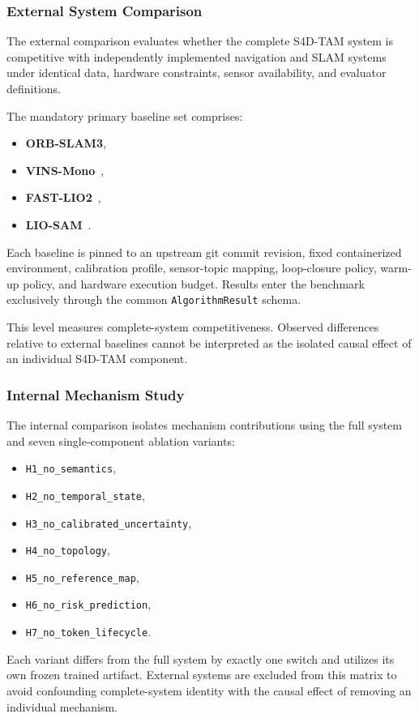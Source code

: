 \subsubsection{External System Comparison}
\label{subsubsec:external_comparison}

The external comparison evaluates whether the complete S4D-TAM system is competitive with independently implemented navigation and SLAM systems under identical data, hardware constraints, sensor availability, and evaluator definitions.

The mandatory primary baseline set comprises:
\begin{itemize}
  \item \textbf{ORB-SLAM3},
  \item \textbf{VINS-Mono}~\cite{qin2018vinsmono},
  \item \textbf{FAST-LIO2}~\cite{xu2022fastlio2},
  \item \textbf{LIO-SAM}~\cite{shan2020liosam}.
\end{itemize}
Each baseline is pinned to an upstream git commit revision, fixed containerized environment, calibration profile, sensor-topic mapping, loop-closure policy, warm-up policy, and hardware execution budget. Results enter the benchmark exclusively through the common \texttt{AlgorithmResult} schema.

This level measures complete-system competitiveness. Observed differences relative to external baselines cannot be interpreted as the isolated causal effect of an individual S4D-TAM component.

\subsubsection{Internal Mechanism Study}
\label{subsubsec:internal_study}

The internal comparison isolates mechanism contributions using the full system and seven single-component ablation variants:
\begin{itemize}
  \item \texttt{H1\_no\_semantics},
  \item \texttt{H2\_no\_temporal\_state},
  \item \texttt{H3\_no\_calibrated\_uncertainty},
  \item \texttt{H4\_no\_topology},
  \item \texttt{H5\_no\_reference\_map},
  \item \texttt{H6\_no\_risk\_prediction},
  \item \texttt{H7\_no\_token\_lifecycle}.
\end{itemize}
Each variant differs from the full system by exactly one switch and utilizes its own frozen trained artifact. External systems are excluded from this matrix to avoid confounding complete-system identity with the causal effect of removing an individual mechanism.

